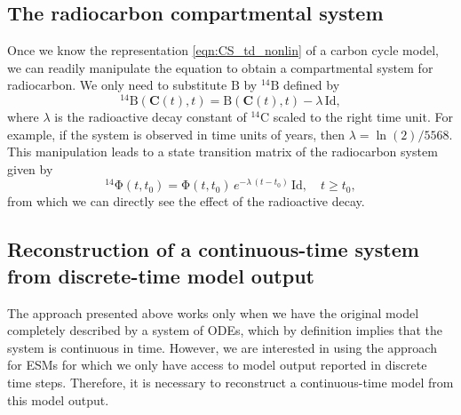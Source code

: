 \documentclass[11pt,a4paper]{article}
\renewcommand{\vec}[1]{\mathbf{#1}}
\newcommand{\tens}[1]{\mathrm{#1}}
\newcommand{\id}{\tens{Id}}
\begin{document}
\subsection{The radiocarbon compartmental system}
    Once we know the representation \eqref{eqn:CS_td_nonlin} of a carbon cycle model, we can readily manipulate the equation to obtain a compartmental system for radiocarbon.
    We only need to substitute $\tens{B}$ by ${}^{14}\tens{B}$ defined by
    \begin{equation*}
        {}^{14}\tens{B}(\vec{C}(t),t) = \tens{B}(\vec{C}(t),t) - \lambda\,\id,
    \end{equation*}
    where $\lambda$ is the radioactive decay constant of ${}^{14}$C scaled to the right time unit.
    For example, if the system is observed in time units of years, then $\lambda=\ln(2)/5568$.
    This manipulation leads to a state transition matrix of the radiocarbon system given by
    \begin{equation*}
        {}^{14}\tens{\Phi}(t,t_0) = \tens{\Phi}(t,t_0)\, e^{-\lambda\,(t-t_0)}\,\id, \quad t\geq t_0,
    \end{equation*}
    from which we can directly see the effect of the radioactive decay.


\subsection{Reconstruction of a continuous-time system from discrete-time model output}
The approach presented above works only when we have the original model completely described by a system of ODEs, which by definition implies that the system is continuous in time. However, we are interested in using the approach for ESMs for which we only have access to model output reported in discrete time steps. Therefore, it is necessary to reconstruct a continuous-time model from this model output. 
    
\end{document}
